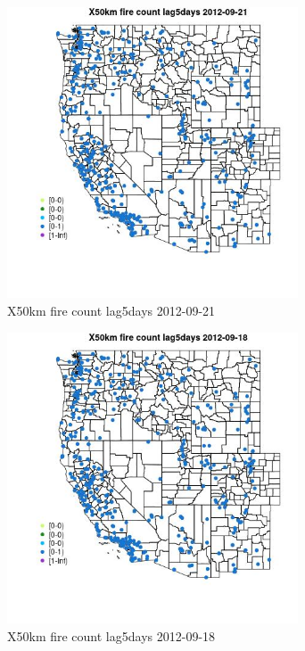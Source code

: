 \begin{figure} 
\centering  
\includegraphics[width=0.77\textwidth]{Code_Outputs/Report_ML_input_PM25_Step4_part_e_de_duplicated_aves_compiled_2019-05-14wNAs_MapObsX50km_fire_count_lag5days2012-09-21.jpg} 
\caption{\label{fig:Report_ML_input_PM25_Step4_part_e_de_duplicated_aves_compiled_2019-05-14wNAsMapObsX50km_fire_count_lag5days2012-09-21}X50km fire count lag5days 2012-09-21} 
\end{figure} 
 

\clearpage 

\begin{figure} 
\centering  
\includegraphics[width=0.77\textwidth]{Code_Outputs/Report_ML_input_PM25_Step4_part_e_de_duplicated_aves_compiled_2019-05-14wNAs_MapObsX50km_fire_count_lag5days2012-09-18.jpg} 
\caption{\label{fig:Report_ML_input_PM25_Step4_part_e_de_duplicated_aves_compiled_2019-05-14wNAsMapObsX50km_fire_count_lag5days2012-09-18}X50km fire count lag5days 2012-09-18} 
\end{figure} 
 

